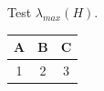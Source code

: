 \documentclass[twocolumn,10pt]{article}
\begin{document}
Test $\lambda_{max}(H)$.
\begin{tabular}{ccc}\toprule A&B&C\\\midrule 1&2&3\\\bottomrule\end{tabular}
\end{document}
